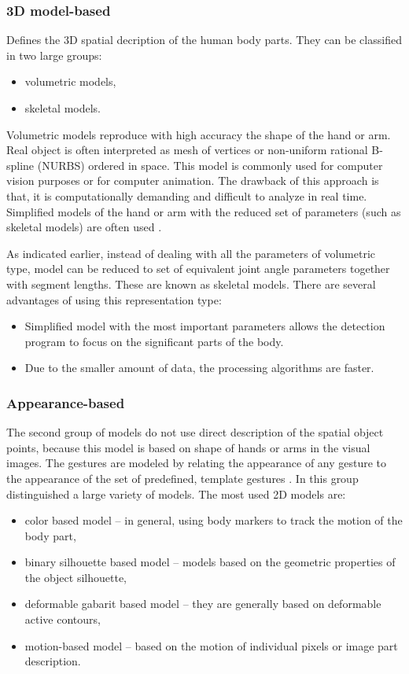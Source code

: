 \subsubsection{3D model-based}

Defines the 3D spatial decription of the human body parts. They can be classified in two large groups:
\begin{itemize}
\item volumetric models,
\item skeletal models.
\end{itemize}
Volumetric models reproduce with high accuracy the shape of the hand or arm. Real object is often interpreted as mesh of vertices or non-uniform rational B-spline (NURBS) ordered in space. This model is commonly used for computer vision purposes or for computer animation. The drawback of this approach is that, it is computationally demanding and difficult to analyze in real time. Simplified models of the hand or arm with the reduced set of parameters (such as skeletal models) are often used \cite{Pavlovic97visualinterpretation}.

As indicated earlier, instead of dealing with all the parameters of volumetric type, model can be reduced to set of equivalent joint angle parameters together with segment lengths. These are known as skeletal models. There are several advantages of using this representation type:
\begin{itemize}
\item Simplified model with the most important parameters allows the detection program to focus on the significant parts of the body.
\item Due to the smaller amount of data, the processing algorithms are faster.
\end{itemize}

\subsubsection{Appearance-based}

The second group of models do not use direct description of the spatial object points, because this model is based on shape of hands or arms in the visual images. The gestures are modeled by relating the appearance of any gesture to the appearance of the set of predefined, template gestures \cite{Pavlovic97visualinterpretation}. In this group distinguished a large variety of models. The most used 2D models are:
\begin{itemize}
\item color based model -- in general, using body markers to track the motion of the body part,
\item binary silhouette based model -- models based on the geometric properties of the object silhouette,
\item deformable gabarit based model -- they are generally based on deformable active contours,
\item motion-based model -- based on the motion of individual pixels or image part description.
\end{itemize}


